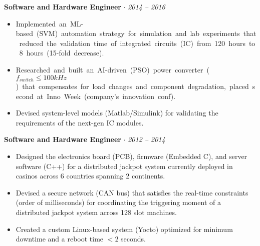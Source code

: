 \documentclass[11pt]{article}
\makeatletter
\newcommand{\hl}[1]{%
    \setbox\@tempboxa\hbox{#1}%
    \ifdim\wd\@tempboxa>\linewidth
    \noindent
    \fcolorbox{black}{white}{%
        \parbox[m]{\dimexpr\linewidth-2\fboxsep}{{\large \onehalfspacing #1}}
          
    }%
    \else
    \fcolorbox{black}{white}{#1}%
    \fi
}%
\newcommand{\checkthis}{{\small \faIcon{star}}}
\makeatother
\begin{document}
\vspace{-1mm}
\textbf{Software and Hardware Engineer} \enskip $\cdot$  \hfill  \textit{\footnotesize 2014 -- 2016}
\begin{rightrule}
    \begin{itemize}[left=5pt]
    \item[\checkthis] \hl{Implemented an ML-based (SVM) automation strategy for simulation and lab experiments that reduced the validation time of integrated circuits (IC) from 120 hours to 8 hours (15-fold decrease).}
    \item[\checkthis] \hl{Researched and built an AI-driven (PSO) power converter ($f_{\scriptscriptstyle switch} \leq 100kHz$) that compensates for load changes and component degradation, placed second at Inno~Week (company's innovation conf).}
    \item Devised system-level models (Matlab/Simulink) for validating the requirements of the next-gen IC modules.
    \end{itemize}
\end{rightrule}
\vspace{-1mm}
\textbf{Software and Hardware Engineer} \enskip $\cdot$  \hfill \textit{\footnotesize 2012 -- 2014}
\begin{rightrule}
    \begin{itemize}[left=5pt]
    \item Designed the electronics board (PCB), firmware (Embedded C), and server software (C++) for a distributed jackpot system currently deployed in casinos across 6 countries spanning 2 continents.
    \item Devised a secure network (CAN bus) that satisfies the real-time constraints (order of milliseconds) for coordinating the triggering moment of a distributed jackpot system across 128 slot machines.
    \item Created a custom Linux-based system (Yocto) optimized for minimum downtime and a reboot time $< 2$ seconds.
    \end{itemize}
\end{rightrule}
\end{document}
